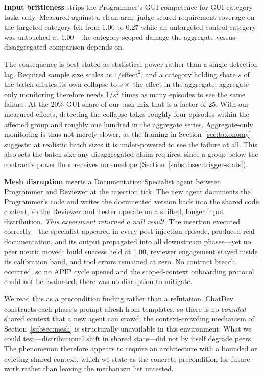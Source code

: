\textbf{Input brittleness} strips the Programmer's GUI competence for
GUI-category tasks only. Measured against a clean arm, judge-scored
requirement coverage on the targeted category fell from 1.00 to 0.27 while an
untargeted control category was untouched at 1.00---the category-scoped damage
the aggregate-versus-disaggregated comparison depends on.

The consequence is best stated as statistical power rather than a single
detection lag. Required sample size scales as $1/\text{effect}^2$, and a
category holding share $s$ of the batch dilutes its own collapse to $s\times$
the effect in the aggregate; aggregate-only monitoring therefore needs
$1/s^{2}$ times as many episodes to see the same failure. At the 20\% GUI
share of our task mix that is a factor of 25. With our measured effects,
detecting the collapse takes roughly four episodes within the affected group
and roughly one hundred in the aggregate series. Aggregate-only monitoring is
thus not merely slower, as the framing in Section~\ref{sec:taxonomy}
suggests: at realistic batch sizes it is under-powered to see the failure at
all. This also sets the batch size any disaggregated claim requires, since a
group below the contract's power floor receives no envelope
(Section~\ref{subsubsec:trigger-stats}).

\textbf{Mesh disruption} inserts a Documentation Specialist agent between
Programmer and Reviewer at the injection tick. The new agent documents the
Programmer's code and writes the documented version back into the shared code
context, so the Reviewer and Tester operate on a shifted, longer input
distribution. \emph{This experiment returned a null result.} The insertion
executed correctly---the specialist appeared in every post-injection episode,
produced real documentation, and its output propagated into all downstream
phases---yet no peer metric moved: build success held at 1.00, reviewer
engagement stayed inside its calibration band, and tool errors remained at
zero. No contract breach occurred, so no APIP cycle opened and the
scoped-context onboarding protocol could not be evaluated: there was no
disruption to mitigate.

We read this as a precondition finding rather than a refutation. ChatDev
constructs each phase's prompt afresh from templates, so there is no
\emph{bounded} shared context that a new agent can crowd; the
context-crowding mechanism of Section~\ref{subsec:mesh} is structurally
unavailable in this environment. What we could test---distributional shift in
shared state---did not by itself degrade peers. The phenomenon therefore
appears to require an architecture with a bounded or evicting shared context,
which we state as the concrete precondition for future work rather than
leaving the mechanism list untested.

